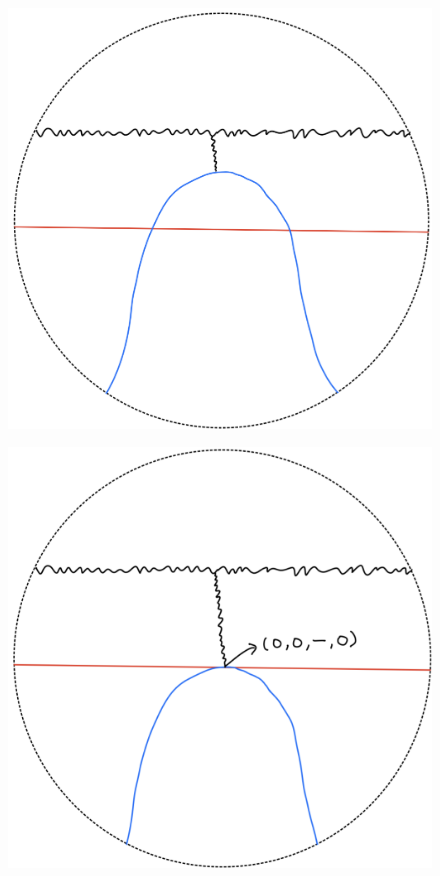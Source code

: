 \begin{definition}
\begin{enumerate}
\begin{itemize}
\begin{figure}[H]
    \caption{}
    \label{fig:your-label}
\end{figure}
\begin{figure}[H]
    \centering
    \includegraphics[scale = 0.45]{diagrams/lemma2/24.png} 
    \caption{}
    \label{fig:your-label}
\end{figure}
\begin{figure}[H]
    \centering
    \includegraphics[scale = 0.45]{diagrams/lemma2/25.png} 

\end{figure}
\end{itemize}
\end{enumerate}
\end{definition}
